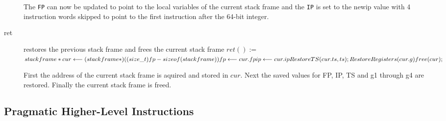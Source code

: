 \documentclass[english,a4paper]{article}
\begin{document}
\begin{description}
	The \verb|FP| can now be updated to point to the local variables 
	of
	the current stack frame and the \verb|IP| is set to the newip 
	value
	with 4 instruction words skipped to point to the first instruction
	after the 64-bit integer.
	
	\item[ret] restores the previous stack frame and frees the current
	stack frame
	$ret() := $  \\
	$ stackframe *cur \longleftarrow (stackframe*)((size\_t)fp - 
	sizeof(stackframe)) \\
	fp \longleftarrow cur.fp \\
	ip \longleftarrow cur.ip \\
	RestoreTS(cur.ts, ts);\\
	RestoreRegisters(cur.g) \\
	free(cur); \\$
	
	First the address of the current stack frame is aquired and stored
	in $cur$.
	Next the saved values for FP, IP, TS and g1 through g4 are 
	restored.
	Finally the current stack frame is freed.
\end{description}

\subsection{Pragmatic Higher-Level Instructions}
\end{document}

